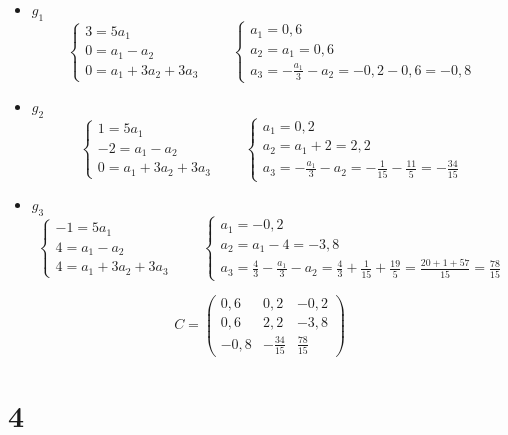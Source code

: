 \begin{itemize}
	\item $ g_1 $
    $$
    \begin{cases}
    	3 = 5a_1 \\
        0 = a_1 - a_2 \\
        0 = a_1 + 3a_2 + 3a_3
    \end{cases} \qquad
    \begin{cases}
    	a_1 = 0,6 \\
        a_2 = a_1 = 0,6 \\
        a_3 = -\frac{a_1}3 - a_2 = -0,2 - 0,6 = -0,8
    \end{cases} $$
    \item $ g_2 $
    $$
    \begin{cases}
    	1 = 5a_1 \\
        -2 = a_1 - a_2 \\
        0 = a_1 + 3a_2 + 3a_3
    \end{cases} \qquad
    \begin{cases}
    	a_1 = 0,2 \\
        a_2 = a_1 + 2 = 2,2 \\
        a_3 = -\frac{a_1}3 - a_2 = -\frac1{15} - \frac{11}5 = -\frac{34}{15}
    \end{cases} $$
    \item $ g_3 $
    $$
    \begin{cases}
    	-1 = 5a_1 \\
        4 = a_1 - a_2 \\
        4 = a_1 + 3a_2 + 3a_3
    \end{cases} \qquad
    \begin{cases}
    	a_1 = -0,2 \\
        a_2 = a_1 - 4 = -3,8 \\
        a_3 = \frac43 - \frac{a_1}3 - a_2 = \frac43 + \frac1{15} + \frac{19}5 = \frac{20 + 1 + 57}{15} = \frac{78}{15}
    \end{cases} $$
\end{itemize}
$$ C =
\begin{pmatrix}
    0,6 & 0,2 & -0,2 \\
    0,6 & 2,2 & -3,8 \\
    -0,8 & -\frac{34}{15} & \frac{78}{15}
\end{pmatrix} $$

\section{4}

